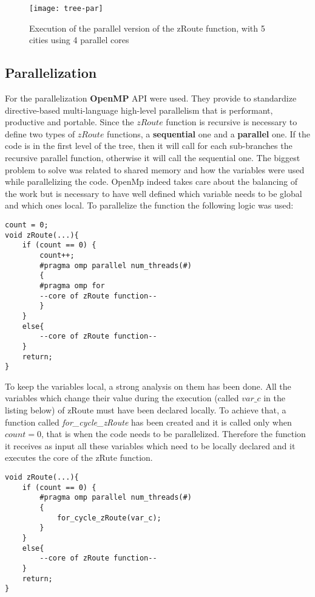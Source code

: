 \documentclass[11pt,conference]{IEEEtran}
\begin{document}
\begin{figure}[h!]
  \centering
    \texttt{[image: tree-par]}
    \caption{Execution of the parallel version of the zRoute function, with 5 cities using 4 parallel cores}
    \label{fig:tree-par}
\end{figure}

\subsection{Parallelization}
For the parallelization \textbf{OpenMP} API were used. They provide to standardize directive-based multi-language high-level parallelism that is performant, productive and portable\cite{citation4}. Since the $zRoute$ function is recursive is necessary to define two types of $zRoute$ functions, a \textbf{sequential} one and a \textbf{parallel} one. If the code is in the first level of the tree, then it will call for each sub-branches the recursive parallel function, otherwise it will call the sequential one.
\newline
The biggest problem to solve was related to shared memory and how the variables were used while parallelizing the code. OpenMp indeed takes care about the balancing of the work but is necessary to have well defined which variable needs to be global and which ones local.
\newline
To parallelize the function the following logic was used:
\begin{lstlisting}
count = 0;
void zRoute(...){
    if (count == 0) {
    	count++;
    	#pragma omp parallel num_threads(#)
    	{
    	#pragma omp for
    	--core of zRoute function--
    	}
    }
    else{
    	--core of zRoute function--
    }
    return;
}
\end{lstlisting}

To keep the variables local, a strong analysis on them has been done. All the variables which change their value during the execution (called $var\_c$ in the listing below) of zRoute must have been declared locally. To achieve that, a function called \textit{for\_cycle\_zRoute} has been created and it is called only when $count = 0$, that is  when the code needs to be parallelized. Therefore the function it receives as input all these variables which need to be locally declared and it executes the core of the zRute function.

\begin{lstlisting}
void zRoute(...){
    if (count == 0) {
    	#pragma omp parallel num_threads(#)
    	{
    		for_cycle_zRoute(var_c);
    	}
    }
    else{
    	--core of zRoute function--
    }
    return;
}
\end{lstlisting}
\end{document}
